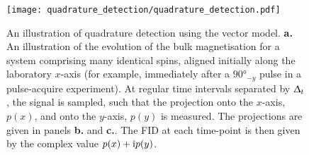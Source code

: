\begin{figure}
    \centering
    \texttt{[image: quadrature\_detection/quadrature\_detection.pdf]}
    \caption[
        An simple illustration of quadrature detection.
    ]{
        An illustration of quadrature detection using the vector
        model\cite[Chapter 1]{Hore2015}.
        \textbf{a.} An illustration of the evolution of the bulk magnetisation
        for a system comprising many identical spins, aligned initially along
        the laboratory $x$-axis (for example, immediately after a
        $\ang{90}_{-y}$ pulse in a pulse-acquire experiment). At regular time
        intervals separated by $\Updelta_t$, the signal is sampled, such that the
        projection onto the $x$-axis, $p(x)$, and onto the $y$-axis, $p(y)$ is
        measured. The projections are given in panels \textbf{b.} and
        \textbf{c.}. The \ac{FID} at each time-point is then given by the
        complex value $p(x) + \mathrm{i} p(y)$.
    }\label{fig:quadrature}
\end{figure}

